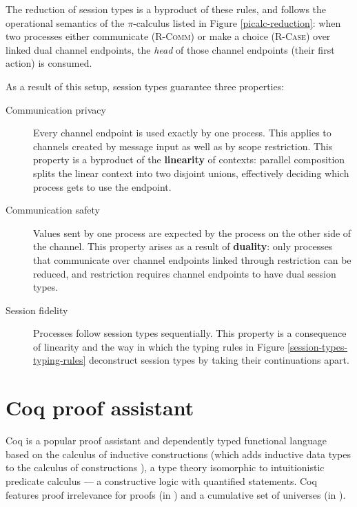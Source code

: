 \documentclass{mproj}
\newcommand{\picalc}{$\pi$-calculus}
\begin{document}
The reduction of session types is a byproduct of these rules, and follows the operational semantics of the \picalc{} listed in Figure \ref{picalc-reduction}: when two processes either communicate (\textsc{R-Comm}) or make a choice (\textsc{R-Case}) over linked dual channel endpoints, the \emph{head} of those channel endpoints (their first action) is consumed.

As a result of this setup, session types guarantee three properties:
\begin{description}
    \item [Communication privacy] Every channel endpoint is used exactly by one process. This applies to channels created by message input as well as by scope restriction. This property is a byproduct of the \textbf{linearity} of contexts: parallel composition splits the linear context into two disjoint unions, effectively deciding which process gets to use the endpoint.
        
    \item [Communication safety] Values sent by one process are expected by the process on the other side of the channel. This property arises as a result of \textbf{duality}: only processes that communicate over channel endpoints linked through restriction can be reduced, and restriction requires channel endpoints to have dual session types.

    \item [Session fidelity] Processes follow session types sequentially. This property is a consequence of linearity and the way in which the typing rules in Figure \ref{session-types-typing-rules} deconstruct session types by taking their continuations apart.
\end{description}

\section{Coq proof assistant}\label{coq}

Coq \cite{CoqDeveloperCommunity} is a popular proof assistant and dependently typed functional language based on the calculus of inductive constructions \cite{Coquand1989} (which adds inductive data types to the calculus of constructions \cite{Coquand1985}), a type theory isomorphic to intuitionistic predicate calculus --- a constructive logic with quantified statements.  Coq features proof irrelevance for proofs (in ) and a cumulative set of universes (in ).
\end{document}
